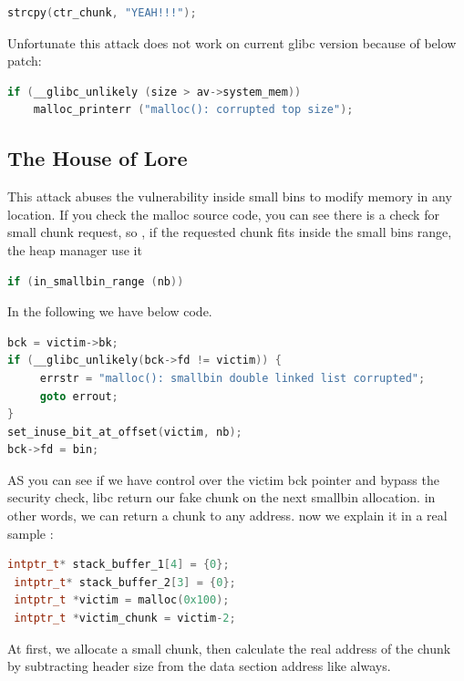 \documentclass{masterthesis}
\newcommand*\libc{glibc}
\newcommand*\sbs{small bins}
\begin{document}
\begin{lstlisting}[language=c,frame=tlrb]
strcpy(ctr_chunk, "YEAH!!!");
\end{lstlisting}

Unfortunate this attack does not work on current \libc{} version because of below patch:
\begin{lstlisting}[language=c,frame=tlrb]
if (__glibc_unlikely (size > av->system_mem))
    malloc_printerr ("malloc(): corrupted top size");
\end{lstlisting}

\subsection{The House of Lore}

This attack abuses the vulnerability inside \sbs{} to modify memory in any location. If you check the malloc source code, you can see there is a check for small chunk request, so , if the requested chunk fits inside the \sbs{} range, the heap manager use it 

\begin{lstlisting}[language=c,frame=tlrb]
if (in_smallbin_range (nb))
\end{lstlisting}

In the following we have below code.

\begin{lstlisting}[language=c,frame=tlrb]
bck = victim->bk;
if (__glibc_unlikely(bck->fd != victim)) {
	 errstr = "malloc(): smallbin double linked list corrupted";
	 goto errout;
}
set_inuse_bit_at_offset(victim, nb);
bck->fd = bin;
\end{lstlisting}

AS you can see if we have control over the victim bck pointer and bypass the security check, libc return our fake chunk on the next smallbin allocation. in other words, we can return a chunk to any address. now we explain it in a real sample :

\begin{lstlisting}[language=c,frame=tlrb]
 intptr_t* stack_buffer_1[4] = {0};
 intptr_t* stack_buffer_2[3] = {0};
 intptr_t *victim = malloc(0x100);
 intptr_t *victim_chunk = victim-2;
\end{lstlisting}

At first, we allocate a small chunk, then calculate the real address of the chunk by subtracting header size from the data section address like always.
\end{document}
